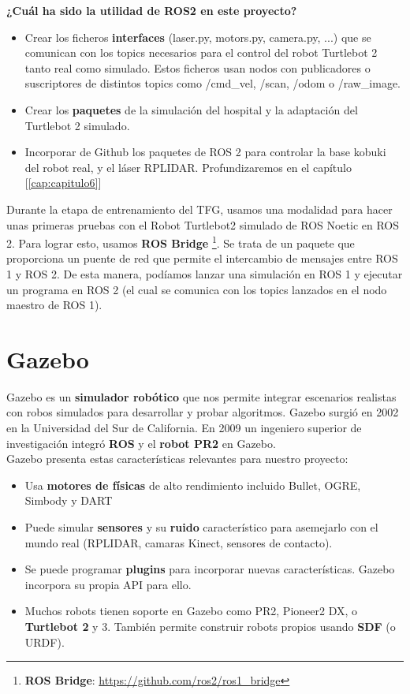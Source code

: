 \textbf{¿Cuál ha sido la utilidad de ROS2 en este proyecto?}
\begin{itemize}
	\item Crear los ficheros \textbf{interfaces} (laser.py, motors.py, camera.py, ...) que se comunican con los topics necesarios para el control del robot Turtlebot 2 tanto real como simulado. Estos ficheros usan nodos con publicadores o suscriptores de distintos topics como /cmd\_vel, /scan, /odom o /raw\_image.
	\item Crear los \textbf{paquetes} de la simulación del hospital y la adaptación del Turtlebot 2 simulado.
	\item Incorporar de Github los paquetes de ROS 2 para controlar la base kobuki del robot real, y el láser RPLIDAR. Profundizaremos en el capítulo [\ref{cap:capitulo6}]
\end{itemize}

Durante la etapa de entrenamiento del TFG, usamos una modalidad para hacer unas primeras pruebas con el Robot Turtlebot2 simulado de ROS Noetic en ROS 2. Para lograr esto, usamos \textbf{ROS Bridge} \footnote{\textbf{ROS Bridge}: \url{https://github.com/ros2/ros1_bridge}}. Se trata de un paquete que proporciona un puente de red que permite el intercambio de mensajes entre ROS 1 y ROS 2. De esta manera, podíamos lanzar una simulación en ROS 1 y ejecutar un programa en ROS 2 (el cual se comunica con los topics lanzados en el nodo maestro de ROS 1).\\




\section{Gazebo}
\label{sec:gazebo}

Gazebo \cite{Gazebo} es un \textbf{simulador robótico} que nos permite integrar escenarios realistas con robos simulados para desarrollar y probar algoritmos. Gazebo surgió en 2002 en la Universidad del Sur de California. En 2009 un ingeniero superior de investigación integró \textbf{ROS} y el \textbf{robot PR2} en Gazebo.\\

Gazebo presenta estas características relevantes para nuestro proyecto:
\begin{itemize}
	\item Usa \textbf{motores de físicas} de alto rendimiento incluido Bullet, OGRE, Simbody y DART
	\item Puede simular \textbf{sensores} y su \textbf{ruido} característico para asemejarlo con el mundo real (RPLIDAR, camaras Kinect, sensores de contacto).
	\item Se puede programar \textbf{plugins} para incorporar nuevas características. Gazebo incorpora su propia API para ello.
	\item Muchos robots tienen soporte en Gazebo como PR2, Pioneer2 DX,  o \textbf{Turtlebot 2} y 3. También permite construir robots propios usando \textbf{SDF} (o URDF).
\end{itemize}

